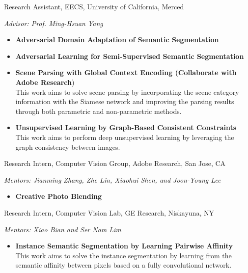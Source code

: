 \documentclass[11pt,letterpaper,sans]{moderncv} %
\begin{document}
%
{Research Assistant, EECS, University of California, Merced}
{}{}{}
{
	\textit{Advisor: Prof. Ming-Hsuan Yang}
	\begin{itemize}
		\item \textbf{Adversarial Domain Adaptation of Semantic Segmentation}
		\item \textbf{Adversarial Learning for Semi-Supervised Semantic Segmentation}
		\item \textbf{Scene Parsing with Global Context Encoding (Collaborate with Adobe Research})\\
		This work aims to solve scene parsing by incorporating the scene category information with the Siamese network and improving the parsing results through both parametric and non-parametric methods.
		\item \textbf{Unsupervised Learning by Graph-Based Consistent Constraints}\\
		This work aims to perform deep unsupervised learning by leveraging the graph consistency between images.
	\end{itemize}
}

%
{Research Intern, Computer Vision Group, Adobe Research, San Jose, CA}
{}{}{}
{
	\textit{Mentors: Jianming Zhang, Zhe Lin, Xiaohui Shen, and Joon-Young Lee}
	\begin{itemize}
		\item \textbf{Creative Photo Blending} 
	\end{itemize} 
}

%
{Research Intern, Computer Vision Lab, GE Research, Niskayuna, NY}
{}{}{}
{
	\textit{Mentors: Xiao Bian and Ser Nam Lim}
	\begin{itemize}
		\item \textbf{Instance Semantic Segmentation by Learning Pairwise Affinity} \\
		This work aims to solve the instance segmentation by learning from the semantic affinity between pixels based on a fully convolutional network.
	\end{itemize}
}
\end{document}
